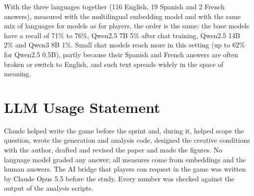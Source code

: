 \documentclass[11pt]{article}
\begin{document}
With the three languages together (116 English, 19 Spanish and 2 French answers), measured with the multilingual embedding model and with the same mix of languages for models as for players, the order is the same: the base models have a recall of 71\% to 76\%, Qwen2.5 7B 5\% after chat training, Qwen2.5 14B 2\% and Qwen3 8B 1\%. Small chat models reach more in this setting (up to 62\% for Qwen2.5 0.5B), partly because their Spanish and French answers are often broken or switch to English, and such text spreads widely in the space of meaning.


\section*{LLM Usage Statement}
Claude helped write the game before the sprint and, during it, helped scope the question, wrote the generation and analysis code, designed the creative conditions with the author, drafted and revised the paper and made the figures. No language model graded any answer; all measures come from embeddings and the human answers. The AI bridge that players can request in the game was written by Claude Opus 5.5 before the study. Every number was checked against the output of the analysis scripts.
\end{document}
